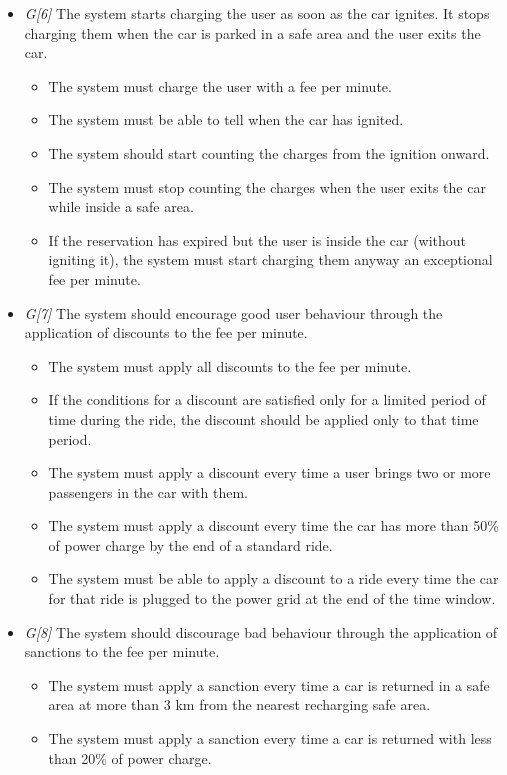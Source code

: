 \begin{itemize}
\begin{itemize}
					\end{itemize}
				
				\item \textit{G[6]} The system starts charging the user as soon as the car ignites. It stops charging them when the car is parked in a safe area and the user exits the car.
					\begin{itemize}
						\item The system must charge the user with a fee per minute.
						\item The system must be able to tell when the car has ignited. 
						\item The system should start counting the charges from the ignition onward. %
						\item The system must stop counting the charges when the user exits the car while inside a safe area.
						\item If the reservation has expired but the user is inside the car (without igniting it), the system must start charging them anyway an exceptional fee per minute. %
					\end{itemize}
					
				\item \textit{G[7]} The system should encourage good user behaviour through the application of discounts to the fee per minute. 
					\begin{itemize}
						\item The system must apply all discounts to the fee per minute.
						\item If the conditions for a discount are satisfied only for a limited period of time during the ride, the discount should be applied only to that time period. %
						\item The system must apply a discount every time a user brings two or more passengers in the car with them.
						\item The system must apply a discount every time the car has more than 50\% of power charge by the end of a standard ride. %
						\item The system must be able to apply a discount to a ride every time the car for that ride is plugged to the power grid at the end of the time window. 
					\end{itemize}
					
				\item \textit{G[8]} The system should discourage bad behaviour through the application of sanctions to the fee per minute.
					\begin{itemize}
						\item The system must apply a sanction every time a car is returned in a safe area at more than 3 km from the nearest recharging safe area.
						\item The system must apply a sanction every time a car is returned with less than 20\% of power charge.
					\end{itemize}
					

\end{itemize}
